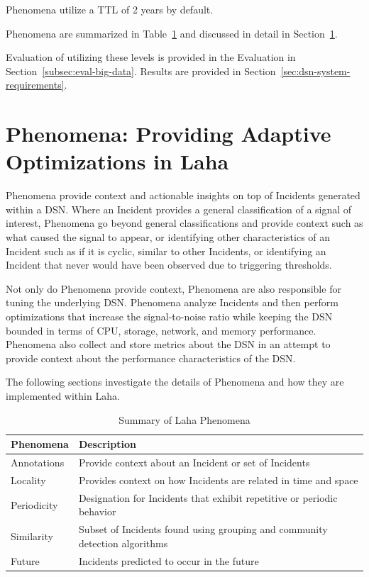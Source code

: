 Phenomena utilize a TTL of 2 years by default.

Phenomena are summarized in Table~\ref{phenomena-summary-table} and discussed in detail in Section~\ref{sec:phenomena}.

Evaluation of utilizing these levels is provided in the Evaluation in Section~\ref{subsec:eval-big-data}. Results are provided in Section~\ref{sec:dsn-system-requirements}.

\section{Phenomena: Providing Adaptive Optimizations in Laha}\label{sec:phenomena}

Phenomena provide context and actionable insights on top of Incidents generated within a DSN. Where an Incident provides a general classification of a signal of interest, Phenomena go beyond general classifications and provide context such as what caused the signal to appear, or identifying other characteristics of an Incident such as if it is cyclic, similar to other Incidents, or identifying an Incident that never would have been observed due to triggering thresholds.

Not only do Phenomena provide context, Phenomena are also responsible for tuning the underlying DSN\@. Phenomena analyze Incidents and then perform optimizations that increase the signal-to-noise ratio while keeping the DSN bounded in terms of CPU, storage, network, and memory performance. Phenomena also collect and store metrics about the DSN in an attempt to provide context about the performance characteristics of the DSN\@.

The following sections investigate the details of Phenomena and how they are implemented within Laha.

\begin{table}[h]
	\centering
	\begin{tabularx}{\textwidth}{lX}
		\toprule
		\textbf{Phenomena} & \textbf{Description} \\
		\midrule
		Annotations & Provide context about an Incident or set of Incidents \\
		Locality & Provides context on how Incidents are related in time and space \\
		Periodicity & Designation for Incidents that exhibit repetitive or periodic behavior \\
		Similarity & Subset of Incidents found using grouping and community detection algorithms \\
		Future & Incidents predicted to occur in the future\\
		\bottomrule
	\end{tabularx}
	\caption{Summary of Laha Phenomena}
	\label{phenomena-summary-table}
\end{table}

